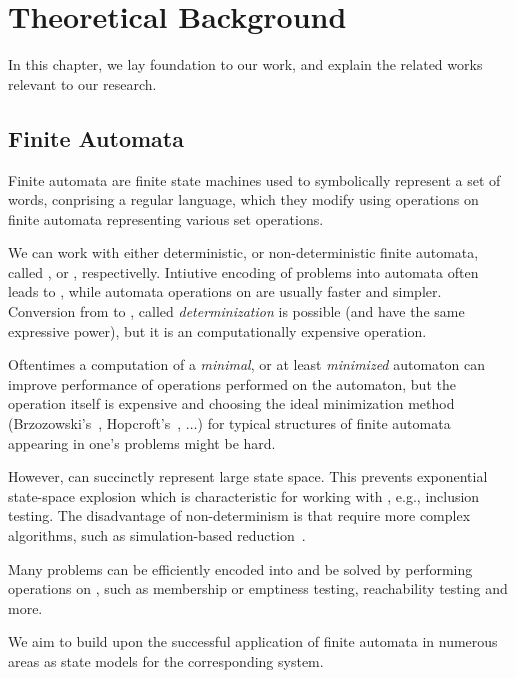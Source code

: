 





\chapter{Theoretical Background}

In this chapter, we lay foundation to our work, and explain the related works relevant to our research.

\section{Finite Automata}

Finite automata are finite state machines used to symbolically represent a set of words, conprising a regular language, which they modify using operations on finite automata representing various set operations.

We can work with either deterministic, or non-deterministic finite automata, called \dfa, or \nfa, respectivelly.
Intiutive encoding of problems into automata often leads to \nfas, while automata operations on \dfas are usually faster and simpler.
Conversion from \nfa to \dfa, called \emph{determinization} is possible (\nfas and \dfas have the same expressive power), but it is an computationally expensive operation.

Oftentimes a computation of a \emph{minimal}, or at least \emph{minimized} automaton can improve performance of operations performed on the automaton, but the operation itself is expensive and choosing the ideal minimization method (Brzozowski's~\cite{Brzozowski1962CanonicalRE}, Hopcroft's~\cite{hopcroft_71}, $\ldots$) for typical structures of finite automata appearing in one's problems might be hard.

However, \nfas can succinctly represent large state space.
This prevents exponential state-space explosion which is characteristic for working with \dfas, e.g., inclusion testing.
The disadvantage of non-determinism is that \nfas require more complex algorithms, such as simulation-based reduction~\cite{ranzato_efficient_2010, holik_optimizing_2009, HHK95}.

Many problems can be efficiently encoded into \nfas and be solved by performing operations on \nfas, such as membership or emptiness testing, reachability testing and more.

We aim to build upon the successful application of finite automata in numerous areas as state models for the corresponding system.

